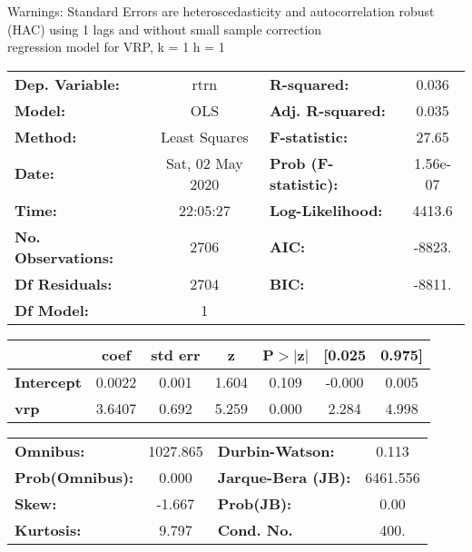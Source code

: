 Warnings: \newline
 [1] Standard Errors are heteroscedasticity and autocorrelation robust (HAC) using 1 lags and without small sample correction\\ 

regression model for VRP, k = 1 h = 1\begin{center}
\begin{tabular}{lclc}
\toprule
\textbf{Dep. Variable:}    &       rtrn       & \textbf{  R-squared:         } &     0.036   \\
\textbf{Model:}            &       OLS        & \textbf{  Adj. R-squared:    } &     0.035   \\
\textbf{Method:}           &  Least Squares   & \textbf{  F-statistic:       } &     27.65   \\
\textbf{Date:}             & Sat, 02 May 2020 & \textbf{  Prob (F-statistic):} &  1.56e-07   \\
\textbf{Time:}             &     22:05:27     & \textbf{  Log-Likelihood:    } &    4413.6   \\
\textbf{No. Observations:} &        2706      & \textbf{  AIC:               } &    -8823.   \\
\textbf{Df Residuals:}     &        2704      & \textbf{  BIC:               } &    -8811.   \\
\textbf{Df Model:}         &           1      & \textbf{                     } &             \\
\bottomrule
\end{tabular}
\begin{tabular}{lcccccc}
                   & \textbf{coef} & \textbf{std err} & \textbf{z} & \textbf{P$> |$z$|$} & \textbf{[0.025} & \textbf{0.975]}  \\
\midrule
\textbf{Intercept} &       0.0022  &        0.001     &     1.604  &         0.109        &       -0.000    &        0.005     \\
\textbf{vrp}       &       3.6407  &        0.692     &     5.259  &         0.000        &        2.284    &        4.998     \\
\bottomrule
\end{tabular}
\begin{tabular}{lclc}
\textbf{Omnibus:}       & 1027.865 & \textbf{  Durbin-Watson:     } &    0.113  \\
\textbf{Prob(Omnibus):} &   0.000  & \textbf{  Jarque-Bera (JB):  } & 6461.556  \\
\textbf{Skew:}          &  -1.667  & \textbf{  Prob(JB):          } &     0.00  \\
\textbf{Kurtosis:}      &   9.797  & \textbf{  Cond. No.          } &     400.  \\
\bottomrule
\end{tabular}
\end{center}

